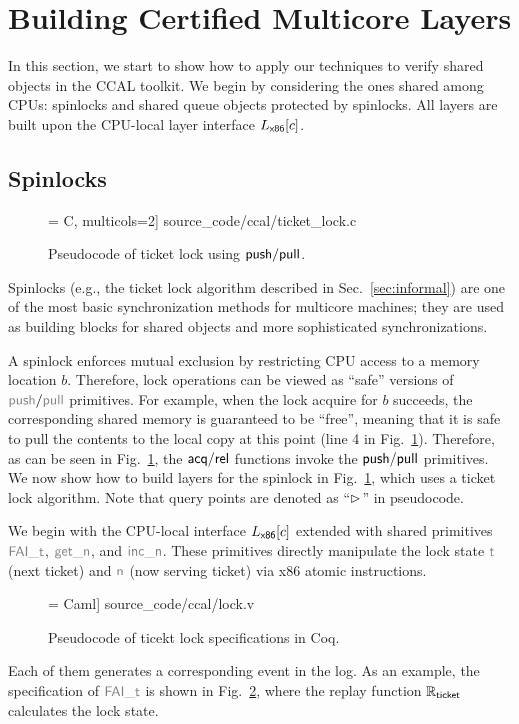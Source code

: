 \section{Building Certified Multicore Layers}
\label{sec:prog}

In this section, we start to show how to apply our techniques to verify shared objects in the CCAL toolkit.
We begin by considering the ones
shared among CPUs: spinlocks and shared queue objects protected by spinlocks.
All layers are built upon the CPU-local layer interface
$L_\mathsf{x86}[c]$.

\subsection{Spinlocks}
\begin{figure}[t]
 = C, multicols=2] {source_code/ccal/ticket_lock.c}
\caption{Pseudocode of ticket lock using $\mathsf{push}/\mathsf{pull}$.}
\label{fig:exp:real_ticket_lock}
\end{figure}

Spinlocks (e.g., the ticket lock algorithm described in Sec.~\ref{sec:informal}) 
are one of the most basic synchronization
methods for multicore machines; they are used as building
blocks for shared objects and more sophisticated synchronizations.

A spinlock enforces mutual exclusion by restricting CPU access to
a memory location $b$. Therefore, lock operations can be viewed
as ``safe'' versions of $\cpush/\cpull$ primitives.
For example, when the lock acquire  for $b$ succeeds,
the corresponding shared memory is guaranteed
to be ``free'', meaning that it is safe to 
pull the contents to the local copy at this point (line 4 in Fig.~\ref{fig:exp:real_ticket_lock}).
Therefore, as can be seen in Fig.~\ref{fig:exp:real_ticket_lock},
the $\mathsf{acq}/\mathsf{rel}$ functions invoke the $\mathsf{push}/\mathsf{pull}$ primitives.
We now show how to build layers for the spinlock
in Fig.~\ref{fig:exp:real_ticket_lock}, which uses a ticket lock algorithm. Note that query points are denoted as ``$\rhd$'' in pseudocode.

We begin with the CPU-local interface $L_\mathsf{x86}[c]$ extended with shared primitives
$\commc{FAI\_t}$, $\commc{get\_n}$, and $\commc{inc\_n}$.
These primitives directly manipulate the lock state $\commc{t}$
(next ticket) and $\commc{n}$ (now serving ticket)
via x86 atomic instructions. 

\begin{figure}[t]
 = Caml] {source_code/ccal/lock.v}
\caption{Pseudocode of ticekt lock specifications in Coq.}
\label{fig:exp:tlock}
\end{figure}
Each of them generates a corresponding event in the 
log. As an example, the specification of $\commc{FAI\_t}$ is shown in Fig.~\ref{fig:exp:tlock},
where the replay function $\mathbb{R}_{\mathsf{\textcolor{black}{ticket}}}$ calculates  the lock state.
 
